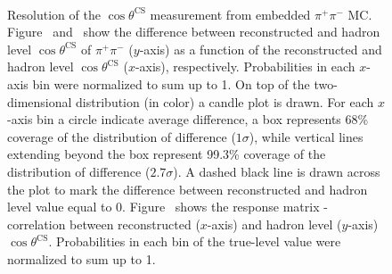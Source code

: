\begin{figure}[h]
\parbox{0.4725\textwidth}{
  \centering
  \begin{subfigure}[b]{\linewidth}\addtocounter{subfigure}{-2}\vspace*{-12pt}
  \end{subfigure}\\
    \begin{minipage}[t][1.042\linewidth][t]{\linewidth}\vspace{10pt}
    \caption[Resolution of the $\cos\theta^{\text{CS}}$ measurement from embedded $\pi^{+}\pi^{-}$ MC.]{Resolution of the $\cos\theta^{\text{CS}}$ measurement from embedded $\pi^{+}\pi^{-}$ MC. Figure~ and~ show the difference between reconstructed and hadron level $\cos\theta^{\text{CS}}$ of $\pi^{+}\pi^{-}$ ($y$-axis) as a function of the reconstructed and hadron level $\cos\theta^{\text{CS}}$ ($x$-axis), respectively. Probabilities in each $x$-axis bin were normalized to sum up to 1. On top of the two-dimensional distribution (in color) a candle plot is drawn. For each $x$-axis bin a circle indicate average difference, a box represents 68\% coverage of the distribution of difference ($1\sigma$), while vertical lines extending beyond the box represent 99.3\% coverage of the distribution of difference ($2.7\sigma$). A dashed black line is drawn across the plot to mark the difference between reconstructed and hadron level value equal to 0. Figure~ shows the response matrix - correlation between reconstructed ($x$-axis) and hadron level ($y$-axis) $\cos\theta^{\text{CS}}$. Probabilities in each bin of the true-level value were normalized to sum up to 1.}\label{fig:Response_CosThetaCS}%
  \end{minipage}
}%
\end{figure}


